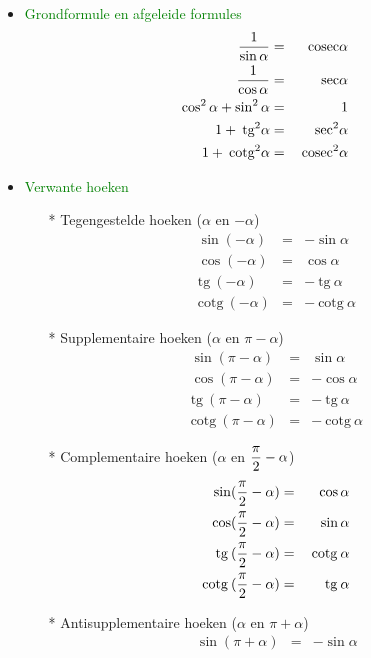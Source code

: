 \begin{itemize}
\item \textcolor{green}{Grondformule en afgeleide formules}
\begin{eqnarray*}
\displaystyle\frac{\displaystyle 1}{\displaystyle \sin\alpha} & = & \mbox{cosec}\alpha\\
\displaystyle\frac{\displaystyle 1}{\displaystyle \cos\alpha} & = & \mbox{sec}\alpha\\
\cos^2\alpha+\sin^2\alpha&=&1\\
1+\:\mbox{tg}^2\alpha &=&\:\mbox{sec}^2\alpha\\
1+\:\mbox{cotg}^2\alpha&=&\:\mbox{cosec}^2\alpha
\end{eqnarray*}
\item \textcolor{green}{\hypertarget{verwante_hoeken}{Verwante hoeken}}\label{verwante hoeken}
	\begin{itemize}%
	\item[*] Tegengestelde hoeken ($\alpha$ en $-\alpha$)
	\begin{eqnarray*}
	\sin(-\alpha)& =&-\sin\alpha\\
	\cos(-\alpha)&=&\cos\alpha\\
	\mbox{tg}\:(-\alpha)&=&-\:\mbox{tg}\:\alpha\\
	\mbox{cotg}\:(-\alpha)&=&-\:\mbox{cotg}\:\alpha
	\end{eqnarray*}
	\item[*] Supplementaire hoeken ($\alpha$ en $\pi-\alpha$)
	\begin{eqnarray*}
	\sin(\pi-\alpha)& =&\sin\alpha\\
	\cos(\pi-\alpha)&=&-\cos\alpha\\
	\mbox{tg}\:(\pi-\alpha)&=&-\:\mbox{tg}\:\alpha\\
	\mbox{cotg}\:(\pi-\alpha)&=&-\:\mbox{cotg}\:\alpha
	\end{eqnarray*}
	\item[*] Complementaire hoeken ($\alpha$ en $\displaystyle\frac{\displaystyle \pi}{\displaystyle 2}-\alpha$)
	\begin{eqnarray*}
	\sin(\displaystyle\frac{\displaystyle \pi}{\displaystyle 2}-\alpha)& =&\cos\alpha\\
	\cos(\displaystyle\frac{\displaystyle \pi}{\displaystyle 2}-\alpha)&=&\sin\alpha\\
	\mbox{tg}\:(\displaystyle\frac{\displaystyle \pi}{\displaystyle 2}-\alpha)&=&\:\mbox{cotg}\:\alpha\\
	\mbox{cotg}\:(\displaystyle\frac{\displaystyle \pi}{\displaystyle 2}-\alpha)&=&\:\mbox{tg}\:\alpha
	\end{eqnarray*}
	\item[*] Antisupplementaire hoeken ($\alpha$ en $\pi+\alpha$)
	\begin{eqnarray*}
	\sin(\pi+\alpha)& =&-\sin\alpha\\

\end{eqnarray*}
\end{itemize}
\end{itemize}
